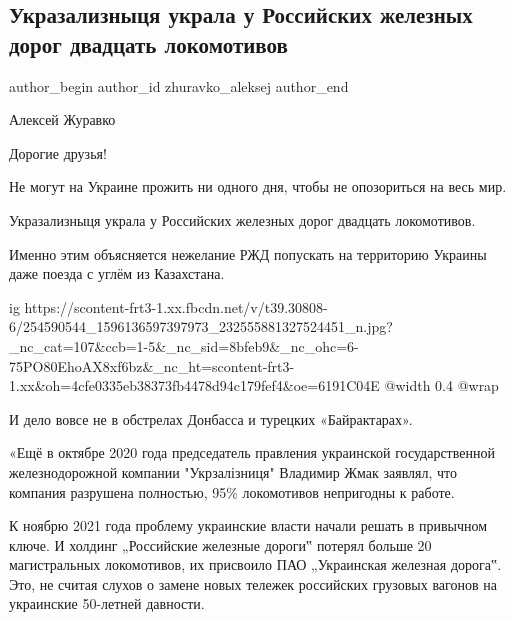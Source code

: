  
 
 
 
 
 
\subsection{Укразализныця украла у Российских железных дорог двадцать локомотивов}
\label{sec:10_11_2021.fb.zhuravko_aleksej.2.ukrzaliznycja_krazha_rzhd}
 
\ifcmt
 author_begin
   author_id zhuravko_aleksej
 author_end
\fi

Алексей Журавко 

Дорогие друзья!

Не могут на Украине прожить ни одного дня, чтобы не опозориться на весь мир.

Укразализныця украла у Российских железных дорог двадцать локомотивов. 

Именно этим объясняется нежелание РЖД попускать на территорию Украины даже
поезда с углём из Казахстана. 

\ifcmt
  ig https://scontent-frt3-1.xx.fbcdn.net/v/t39.30808-6/254590544_1596136597397973_232555881327524451_n.jpg?_nc_cat=107&ccb=1-5&_nc_sid=8bfeb9&_nc_ohc=6-75PO80EhoAX8xf6bz&_nc_ht=scontent-frt3-1.xx&oh=4cfe0335eb38373fb4478d94c179fef4&oe=6191C04E
  @width 0.4
  @wrap 
\fi

И  дело вовсе не в обстрелах Донбасса и турецких «Байрактарах».

«Ещё в октябре 2020 года председатель правления украинской государственной
железнодорожной компании "Укрзалізниця" Владимир Жмак заявлял, что компания
разрушена полностью, 95\% локомотивов непригодны к работе.

К ноябрю 2021 года проблему украинские власти начали решать в привычном ключе.
И холдинг „Российские железные дороги‟ потерял больше 20 магистральных
локомотивов, их присвоило ПАО „Украинская железная дорога‟. Это, не считая
слухов о замене новых тележек российских грузовых вагонов на украинские
50-летней давности.

